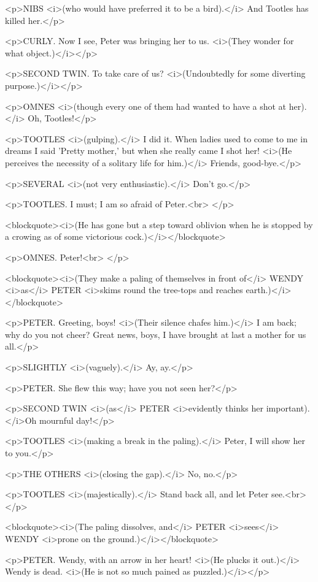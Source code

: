 <p>NIBS <i>(who would have preferred it to be a bird).</i> And
Tootles has killed her.</p>

<p>CURLY. Now I see, Peter was bringing her to us. <i>(They wonder
for what object.)</i></p>

<p>SECOND TWIN. To take care of us? <i>(Undoubtedly for some
diverting purpose.)</i></p>

<p>OMNES <i>(though every one of them had wanted to have a shot at
her).</i> Oh, Tootles!</p>

<p>TOOTLES <i>(gulping).</i> I did it. When ladies used to come to me
in dreams I said 'Pretty mother,' but when she really came I shot
her! <i>(He perceives the necessity of a solitary life for him.)</i>
Friends, good-bye.</p>

<p>SEVERAL <i>(not very enthusiastic).</i> Don't go.</p>

<p>TOOTLES. I must; I am so afraid of Peter.<br>
</p>

<blockquote><i>(He has gone but a step toward oblivion when he is
stopped by a crowing as of some victorious cock.)</i></blockquote>

<p>OMNES. Peter!<br>
</p>

<blockquote><i>(They make a paling of themselves in front of</i>
WENDY <i>as</i> PETER <i>skims round the tree-tops and reaches
earth.)</i></blockquote>

<p>PETER. Greeting, boys! <i>(Their silence chafes him.)</i> I am
back; why do you not cheer? Great news, boys, I have brought at last
a mother for us all.</p>

<p>SLIGHTLY <i>(vaguely).</i> Ay, ay.</p>

<p>PETER. She flew this way; have you not seen her?</p>

<p>SECOND TWIN <i>(as</i> PETER <i>evidently thinks her
important).</i>Oh mournful day!</p>

<p>TOOTLES <i>(making a break in the paling).</i> Peter, I will show
her to you.</p>

<p>THE OTHERS <i>(closing the gap).</i> No, no.</p>

<p>TOOTLES <i>(majestically).</i> Stand back all, and let Peter
see.<br>
</p>

<blockquote><i>(The paling dissolves, and</i> PETER <i>sees</i> WENDY
<i>prone on the ground.)</i></blockquote>

<p>PETER. Wendy, with an arrow in her heart! <i>(He plucks it
out.)</i> Wendy is dead. <i>(He is not so much pained as
puzzled.)</i></p>

